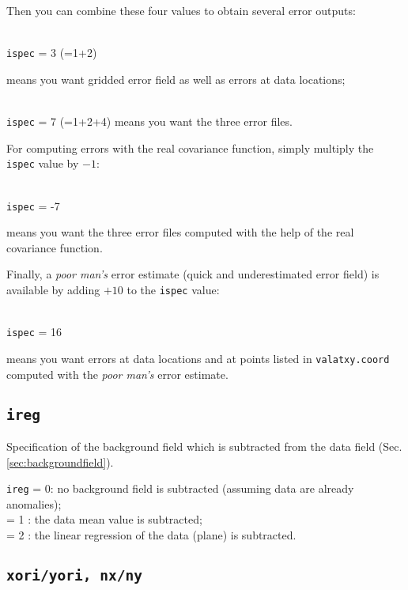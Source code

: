 Then you can combine these four values to obtain several error outputs:

\examples\\
\texttt{ispec}             = 3 (=1+2)\hphantom{+4} \qquad \begin{minipage}[t]{.7\textwidth}means you want gridded error field as well as errors at data locations;\end{minipage}\\ 
\texttt{ispec}             = 7 (=1+2+4) \qquad means you want the three error files.


For computing errors with the real covariance function, %
simply multiply the \texttt{ispec} value by $-1$:

\example\\
\texttt{ispec}             = -7 \qquad \begin{minipage}[t]{.7\textwidth}{means you want the three error files computed with the help of the real covariance function.}\end{minipage}


Finally, a \textit{poor man's} error estimate (quick and underestimated error field) is available by adding $+10$ to the \texttt{ispec} value:

\example\\
\texttt{ispec}             = 16 \qquad \begin{minipage}[t]{.7\textwidth}{means you want errors at data locations and at points listed in \texttt{valatxy.coord} computed with the \textit{poor man's} error estimate.}\end{minipage}


\subsection{\texttt{ireg}}

Specification of the background field which is subtracted from the data field (Sec. \ref{sec:backgroundfield}).

\texttt{ireg}             = 0\qquad: no background field is subtracted (assuming data are already anomalies); \\
  = 1 \qquad: the data mean value is subtracted;\\
  = 2 \qquad: the linear regression of the data (plane) is subtracted.

\subsection{\texttt{xori/yori, nx/ny}}

